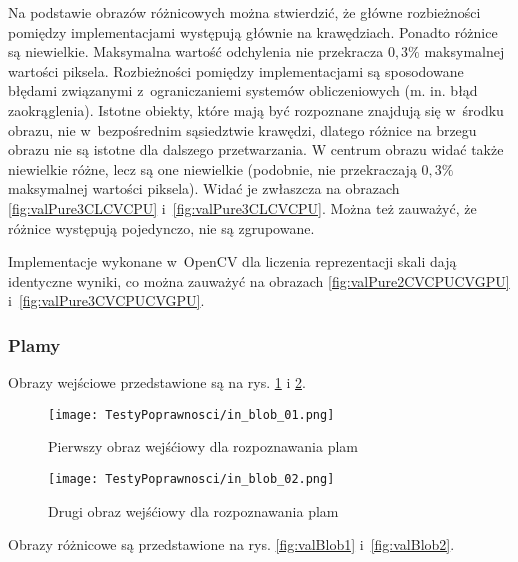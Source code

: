 Na podstawie obrazów różnicowych można stwierdzić, że główne rozbieżności pomiędzy implementacjami występują głównie na krawędziach. Ponadto różnice są niewielkie. Maksymalna wartość odchylenia nie przekracza $ 0,3\% $ maksymalnej wartości piksela. Rozbieżności pomiędzy implementacjami są sposodowane błędami związanymi z~ograniczaniemi systemów obliczeniowych (m. in. błąd zaokrąglenia). Istotne obiekty, które mają być rozpoznane znajdują się w~środku obrazu, nie w~bezpośrednim sąsiedztwie krawędzi, dlatego różnice na brzegu obrazu nie są istotne dla dalszego przetwarzania. W centrum obrazu widać także niewielkie różne, lecz są one niewielkie (podobnie, nie przekraczają $ 0,3\% $ maksymalnej wartości piksela). Widać je zwłaszcza na obrazach \ref{fig:valPure3CLCVCPU} i~\ref{fig:valPure3CLCVCPU}. Można też zauważyć, że różnice występują pojedynczo, nie są zgrupowane.

Implementacje wykonane w~OpenCV dla liczenia reprezentacji skali dają identyczne wyniki, co można zauważyć na obrazach \ref{fig:valPure2CVCPUCVGPU} i~\ref{fig:valPure3CVCPUCVGPU}.

\subsubsection{Plamy}
\label{subsubsec:plamyRysunki}

Obrazy wejściowe przedstawione są na rys. \ref{fig:valBlob01} i \ref{fig:valBlob02}.

\begin{figure}
\begin{center}
\texttt{[image: TestyPoprawnosci/in\_blob\_01.png]}
\end{center}
\caption{Pierwszy obraz wejśćiowy dla rozpoznawania plam}
\label{fig:valBlob01}
\end{figure}

\begin{figure}
\begin{center}
\texttt{[image: TestyPoprawnosci/in\_blob\_02.png]}
\end{center}
\caption{Drugi obraz wejśćiowy dla rozpoznawania plam}
\label{fig:valBlob02}
\end{figure}

Obrazy różnicowe są przedstawione na rys. \ref{fig:valBlob1} i~\ref{fig:valBlob2}. 

